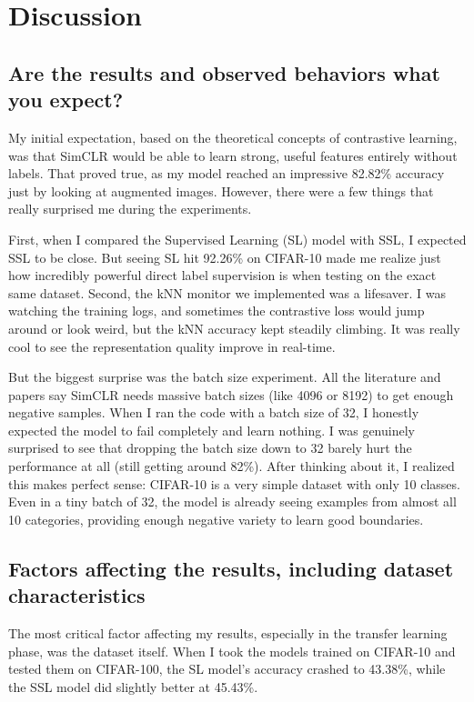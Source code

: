 \documentclass[12pt]{article}
\begin{document}
\section{Discussion}

\subsection{Are the results and observed behaviors what you expect?}
My initial expectation, based on the theoretical concepts of contrastive learning, was that SimCLR would be able to learn strong, useful features entirely without labels. That proved true, as my model reached an impressive 82.82\% accuracy just by looking at augmented images. However, there were a few things that really surprised me during the experiments. 

First, when I compared the Supervised Learning (SL) model with SSL, I expected SSL to be close. But seeing SL hit 92.26\% on CIFAR-10 made me realize just how incredibly powerful direct label supervision is when testing on the exact same dataset. Second, the kNN monitor we implemented was a lifesaver. I was watching the training logs, and sometimes the contrastive loss would jump around or look weird, but the kNN accuracy kept steadily climbing. It was really cool to see the representation quality improve in real-time.

But the biggest surprise was the batch size experiment. All the literature and papers say SimCLR needs massive batch sizes (like 4096 or 8192) to get enough negative samples. When I ran the code with a batch size of 32, I honestly expected the model to fail completely and learn nothing. I was genuinely surprised to see that dropping the batch size down to 32 barely hurt the performance at all (still getting around 82\%). After thinking about it, I realized this makes perfect sense: CIFAR-10 is a very simple dataset with only 10 classes. Even in a tiny batch of 32, the model is already seeing examples from almost all 10 categories, providing enough negative variety to learn good boundaries.

\subsection{Factors affecting the results, including dataset characteristics}
The most critical factor affecting my results, especially in the transfer learning phase, was the dataset itself. When I took the models trained on CIFAR-10 and tested them on CIFAR-100, the SL model's accuracy crashed to 43.38\%, while the SSL model did slightly better at 45.43\%. 
\end{document}
